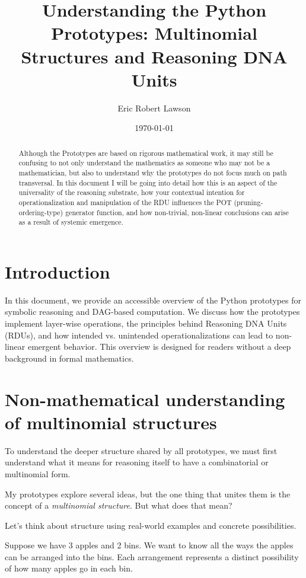 \documentclass[11pt]{article}
\title{Understanding the Python Prototypes: Multinomial Structures and Reasoning DNA Units}
\author{Eric Robert Lawson}
\date{\today}
\begin{document}
\maketitle

\begin{abstract}
Although the Prototypes are based on rigorous mathematical work, it may still be confusing to not only understand the mathematics as someone who may not be a mathematician, but also to understand why the prototypes do not focus much on path transversal. In this document I will be going into detail how this is an aspect of the universality of the reasoning substrate, how your contextual intention for operationalization and manipulation of the RDU influences the POT (pruning-ordering-type) generator function, and how non-trivial, non-linear conclusions can arise as a result of systemic emergence.
\end{abstract}

\tableofcontents

\section{Introduction}
In this document, we provide an accessible overview of the Python prototypes for symbolic reasoning and DAG-based computation. 
We discuss how the prototypes implement layer-wise operations, the principles behind Reasoning DNA Units (RDUs), 
and how intended vs. unintended operationalizations can lead to non-linear emergent behavior. 
This overview is designed for readers without a deep background in formal mathematics.

\section{Non-mathematical understanding of multinomial structures}

To understand the deeper structure shared by all prototypes, we must first understand what it means for reasoning itself to have a combinatorial or multinomial form.

My prototypes explore several ideas, but the one thing that unites them is the concept of a \emph{multinomial structure}. But what does that mean?

Let's think about structure using real-world examples and concrete possibilities.

Suppose we have 3 apples and 2 bins. We want to know all the ways the apples can be arranged into the bins.  
Each arrangement represents a distinct possibility of how many apples go in each bin.  
\end{document}
